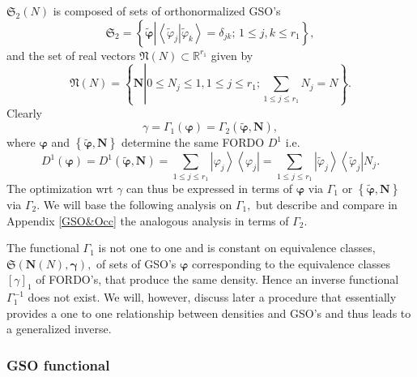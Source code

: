 \documentclass[aps,preprint]{revtex4}%
\begin{document}
$\mathfrak{S}_{2}\left(  N\right)  $ is composed of sets of orthonormalized
GSO's
\begin{equation}
\mathfrak{S}_{2}=\left\{  \boldsymbol{\tilde{\varphi}}\left\vert \left\langle
\left.  \tilde{\varphi}_{j}\right\vert \tilde{\varphi}_{k}\right\rangle
=\delta_{jk};\,1\leq j,k\leq r_{1}\right.  \right\}  ,
\end{equation}
and the set of real vectors $\mathfrak{N}\left(  N\right)  \subset
\mathbb{R}^{r_{1}}$ given by
\begin{equation}
\mathfrak{N}\left(  N\right)  =\left\{  \boldsymbol{N}\left\vert 0\leq
N_{j}\leq1,1\leq j\leq r_{1};\sum_{1\leq j\leq r_{1}}N_{j}=N\right.  \right\}
.
\end{equation}
Clearly
\begin{equation}
\gamma=\Gamma_{1}\left(  \boldsymbol{\varphi}\right)  =\Gamma_{2}\left(
\boldsymbol{\tilde{\varphi},N}\right)  ,
\end{equation}
where $\boldsymbol{\varphi}$ and $\left\{  \boldsymbol{\tilde{\varphi}%
,N}\right\}  $ determine the same FORDO $D^{1}$ i.e.
\begin{equation}
D^{1}\left(  \boldsymbol{\varphi}\right)  =D^{1}\left(  \boldsymbol{\tilde
{\varphi},N}\right)  =\sum_{1\leq j\leq r_{1}}\left\vert \varphi
_{j}\right\rangle \left\langle \varphi_{j}\right\vert =\sum_{1\leq j\leq
r_{1}}\left\vert \tilde{\varphi}_{j}\right\rangle \left\langle \tilde{\varphi
}_{j}\right\vert N_{j}.
\end{equation}
The optimization wrt $\gamma$ can thus be expressed in terms of
$\boldsymbol{\varphi}$ via $\Gamma_{1}$ or $\left\{  \boldsymbol{\tilde
{\varphi},N}\right\}  $ via $\Gamma_{2}.$ We will base the following analysis
on $\Gamma_{1},$ but describe and compare in Appendix \ref{GSO&Occ} the
analogous analysis in terms of $\Gamma_{2}.$

The functional $\Gamma_{1}$ is not one to one and is constant on equivalence
classes, $\mathfrak{S}\left(  \boldsymbol{N}\left(  N\right)
\boldsymbol{,\gamma}\right)  ,$ of sets of GSO's $\boldsymbol{\varphi}$
corresponding to the equivalence classes $\left[  \gamma\right]  _{1}$ of
FORDO's, that produce the same density. Hence an inverse functional
$\Gamma_{1}^{-1}$ does not exist. We will, however, discuss later a procedure
that essentially provides a one to one relationship between densities and
GSO's and thus leads to a generalized inverse.

\subsubsection{GSO functional}
\end{document}
